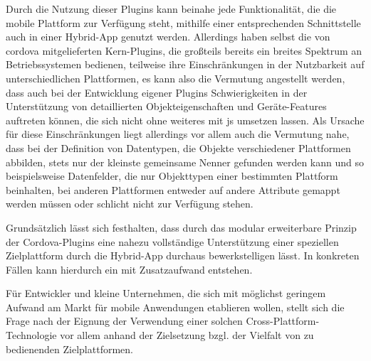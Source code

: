 
Durch die Nutzung dieser Plugins kann beinahe jede Funktionalität, die die mobile Plattform zur Verfügung steht, mithilfe einer entsprechenden Schnittstelle auch in einer Hybrid-App genutzt werden.
Allerdings haben selbst die von \gls{cordova} mitgelieferten Kern-Plugins, die großteils bereits ein breites Spektrum an Betriebssystemen bedienen, teilweise ihre Einschränkungen in der Nutzbarkeit auf unterschiedlichen Plattformen, es kann also die Vermutung angestellt werden, dass auch bei der Entwicklung eigener Plugins Schwierigkeiten in der Unterstützung von detaillierten Objekteigenschaften und Geräte-Features auftreten können, die sich nicht ohne weiteres mit \gls{js} umsetzen lassen. 
Als Ursache für diese Einschränkungen liegt allerdings vor allem auch die Vermutung nahe, dass bei der Definition von Datentypen, die Objekte verschiedener Plattformen abbilden, stets nur der kleinste gemeinsame Nenner gefunden werden kann und so beispielsweise Datenfelder, die nur Objekttypen einer bestimmten Plattform beinhalten, bei anderen Plattformen entweder auf andere Attribute gemappt werden müssen oder schlicht nicht zur Verfügung stehen. 


Grundsätzlich lässt sich festhalten, dass durch das modular erweiterbare Prinzip der Cordova-Plugins eine nahezu vollständige Unterstützung einer speziellen Zielplattform durch die Hybrid-App durchaus bewerkstelligen lässt.
In konkreten Fällen kann hierdurch ein mit Zusatzaufwand entstehen.


Für Entwickler und kleine Unternehmen, die sich mit möglichst geringem Aufwand am Markt für mobile Anwendungen etablieren wollen, stellt sich die Frage nach der Eignung der Verwendung einer solchen Cross-Plattform-Technologie vor allem anhand der Zielsetzung bzgl. der Vielfalt von zu bedienenden Zielplattformen.

